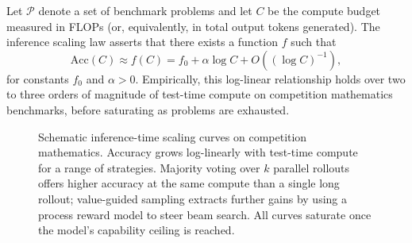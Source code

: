 Let $\mathcal{P}$ denote a set of benchmark problems and let
$C$ be the compute budget measured in FLOPs (or, equivalently, in
total output tokens generated). The inference scaling law asserts that
there exists a function $f$ such that
\begin{equation}
\label{eq:inference-scaling}
\text{Acc}(C) \approx f(C) = f_0 + \alpha \log C + O((\log C)^{-1}),
\end{equation}
for constants $f_0$ and $\alpha > 0$. Empirically, this log-linear
relationship holds over two to three orders of magnitude of test-time
compute on competition mathematics benchmarks, before saturating as
problems are exhausted.

\begin{figure}[ht]
\centering
{}
\caption{Schematic inference-time scaling curves on competition
  mathematics. Accuracy grows log-linearly with test-time compute for
  a range of strategies. Majority voting over $k$ parallel rollouts
  offers higher accuracy at the same compute than a single long
  rollout; value-guided sampling extracts further gains by using a
  process reward model to steer beam search. All curves saturate once
  the model's capability ceiling is reached.}
\label{fig:inference-scaling}
\end{figure}

